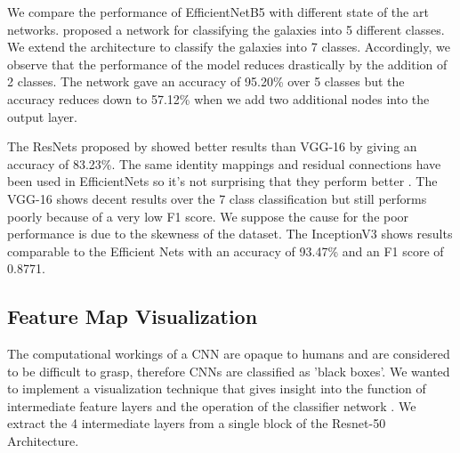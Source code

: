 \documentclass[fleqn,usenatbib]{mnras}
\begin{document}
\hspace*{0.25 in}We compare the performance of EfficientNetB5 with different state of the art networks. \citet{dai2018galaxy} proposed a network for classifying the galaxies into 5 different classes. We extend the architecture to classify the galaxies into 7 classes. Accordingly, we observe that the performance of the model reduces drastically by the addition of 2 classes. The network gave an accuracy of 95.20\% over 5 classes but the accuracy reduces down to 57.12\% when we add two additional nodes into the output layer. 


The ResNets proposed by \citet{he2016} showed better results than VGG-16 by giving an accuracy of 83.23\%. The same identity mappings and residual connections have been used in EfficientNets so it's not surprising that they perform better \citep{tan2019efficientnet}. The VGG-16 shows decent results over the 7 class classification but still performs poorly because of a very low F1 score. We suppose the cause for the poor performance is due to the skewness of the dataset. The InceptionV3 shows results comparable to the Efficient Nets with an accuracy of 93.47\% and an F1 score of 0.8771.

\subsection{Feature Map Visualization}
\hspace*{0.25in} The computational workings of a CNN are opaque to humans and are considered to be difficult to grasp, therefore CNNs are classified as 'black boxes'. We wanted to implement a visualization technique that gives insight into the function of intermediate feature layers and the operation of the classifier network \citep{zeilar2014}. We extract the 4 intermediate layers from a single block of the Resnet-50 Architecture.
\end{document}
